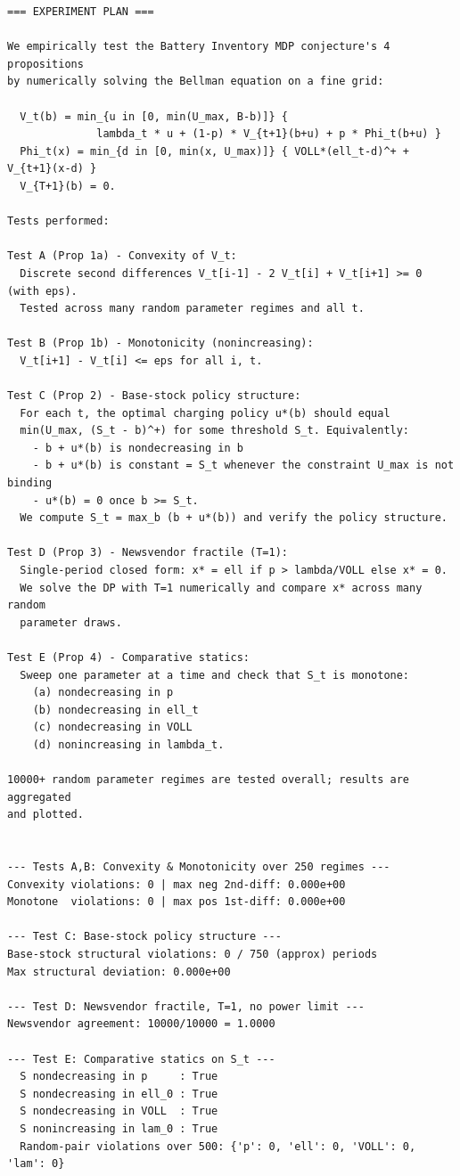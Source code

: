 \documentclass[11pt]{article}
\begin{document}
\begin{lstlisting}
=== EXPERIMENT PLAN ===

We empirically test the Battery Inventory MDP conjecture's 4 propositions
by numerically solving the Bellman equation on a fine grid:

  V_t(b) = min_{u in [0, min(U_max, B-b)]} {
              lambda_t * u + (1-p) * V_{t+1}(b+u) + p * Phi_t(b+u) }
  Phi_t(x) = min_{d in [0, min(x, U_max)]} { VOLL*(ell_t-d)^+ + V_{t+1}(x-d) }
  V_{T+1}(b) = 0.

Tests performed:

Test A (Prop 1a) - Convexity of V_t:
  Discrete second differences V_t[i-1] - 2 V_t[i] + V_t[i+1] >= 0 (with eps).
  Tested across many random parameter regimes and all t.

Test B (Prop 1b) - Monotonicity (nonincreasing):
  V_t[i+1] - V_t[i] <= eps for all i, t.

Test C (Prop 2) - Base-stock policy structure:
  For each t, the optimal charging policy u*(b) should equal
  min(U_max, (S_t - b)^+) for some threshold S_t. Equivalently:
    - b + u*(b) is nondecreasing in b
    - b + u*(b) is constant = S_t whenever the constraint U_max is not binding
    - u*(b) = 0 once b >= S_t.
  We compute S_t = max_b (b + u*(b)) and verify the policy structure.

Test D (Prop 3) - Newsvendor fractile (T=1):
  Single-period closed form: x* = ell if p > lambda/VOLL else x* = 0.
  We solve the DP with T=1 numerically and compare x* across many random
  parameter draws.

Test E (Prop 4) - Comparative statics:
  Sweep one parameter at a time and check that S_t is monotone:
    (a) nondecreasing in p
    (b) nondecreasing in ell_t
    (c) nondecreasing in VOLL
    (d) nonincreasing in lambda_t.

10000+ random parameter regimes are tested overall; results are aggregated
and plotted.


--- Tests A,B: Convexity & Monotonicity over 250 regimes ---
Convexity violations: 0 | max neg 2nd-diff: 0.000e+00
Monotone  violations: 0 | max pos 1st-diff: 0.000e+00

--- Test C: Base-stock policy structure ---
Base-stock structural violations: 0 / 750 (approx) periods
Max structural deviation: 0.000e+00

--- Test D: Newsvendor fractile, T=1, no power limit ---
Newsvendor agreement: 10000/10000 = 1.0000

--- Test E: Comparative statics on S_t ---
  S nondecreasing in p     : True
  S nondecreasing in ell_0 : True
  S nondecreasing in VOLL  : True
  S nonincreasing in lam_0 : True
  Random-pair violations over 500: {'p': 0, 'ell': 0, 'VOLL': 0, 'lam': 0}


\end{lstlisting}
\end{document}

